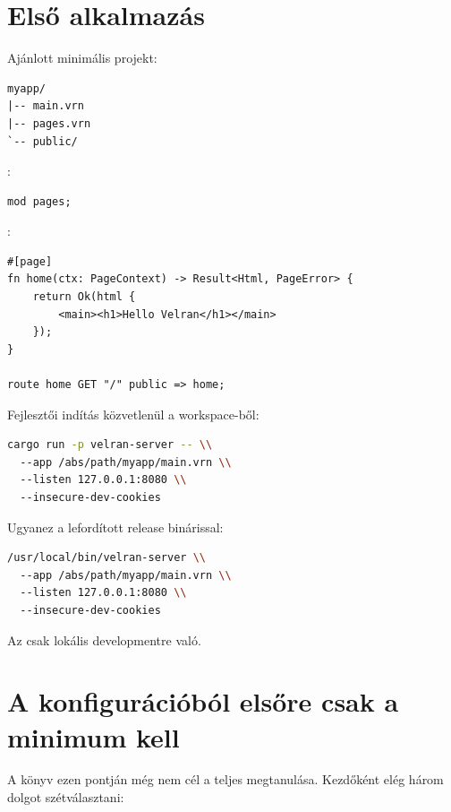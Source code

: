 \section{Első alkalmazás}

Ajánlott minimális projekt:

\begin{lstlisting}
myapp/
|-- main.vrn
|-- pages.vrn
`-- public/
\end{lstlisting}

:

\begin{lstlisting}[language=Velran]
mod pages;
\end{lstlisting}

:

\begin{lstlisting}[language=Velran]
#[page]
fn home(ctx: PageContext) -> Result<Html, PageError> {
    return Ok(html {
        <main><h1>Hello Velran</h1></main>
    });
}

route home GET "/" public => home;
\end{lstlisting}

Fejlesztői indítás közvetlenül a workspace-ből:

\begin{lstlisting}[language=bash]
cargo run -p velran-server -- \\
  --app /abs/path/myapp/main.vrn \\
  --listen 127.0.0.1:8080 \\
  --insecure-dev-cookies
\end{lstlisting}

Ugyanez a lefordított release binárissal:

\begin{lstlisting}[language=bash]
/usr/local/bin/velran-server \\
  --app /abs/path/myapp/main.vrn \\
  --listen 127.0.0.1:8080 \\
  --insecure-dev-cookies
\end{lstlisting}

Az  csak lokális developmentre való.

\section{A konfigurációból elsőre csak a minimum kell}

A könyv ezen pontján még nem cél a teljes  megtanulása. Kezdőként elég három dolgot szétválasztani:

